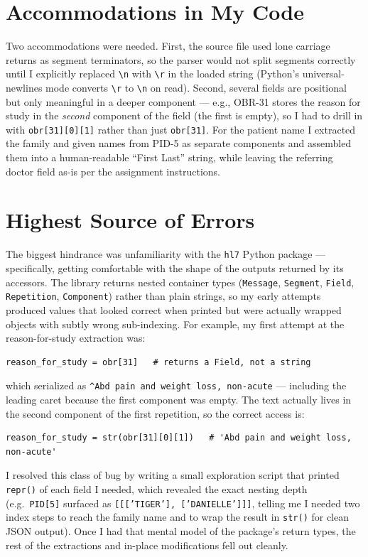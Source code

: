 \documentclass[10pt]{article}
\begin{document}
\section*{Accommodations in My Code}
Two accommodations were needed. First, the source file used lone carriage returns as segment terminators, so the parser would not split segments correctly until I explicitly replaced \verb|\n| with \verb|\r| in the loaded string (Python's universal-newlines mode converts \verb|\r| to \verb|\n| on read). Second, several fields are positional but only meaningful in a deeper component --- e.g., OBR-31 stores the reason for study in the \emph{second} component of the field (the first is empty), so I had to drill in with \texttt{obr[31][0][1]} rather than just \texttt{obr[31]}. For the patient name I extracted the family and given names from PID-5 as separate components and assembled them into a human-readable ``First Last'' string, while leaving the referring doctor field as-is per the assignment instructions.

\section*{Highest Source of Errors}
The biggest hindrance was unfamiliarity with the \texttt{hl7} Python package --- specifically, getting comfortable with the shape of the outputs returned by its accessors. The library returns nested container types (\texttt{Message}, \texttt{Segment}, \texttt{Field}, \texttt{Repetition}, \texttt{Component}) rather than plain strings, so my early attempts produced values that looked correct when printed but were actually wrapped objects with subtly wrong sub-indexing. For example, my first attempt at the reason-for-study extraction was:

\begin{lstlisting}
reason_for_study = obr[31]   # returns a Field, not a string
\end{lstlisting}

\noindent which serialized as \texttt{\^{}Abd pain and weight loss, non-acute} --- including the leading caret because the first component was empty. The text actually lives in the second component of the first repetition, so the correct access is:

\begin{lstlisting}
reason_for_study = str(obr[31][0][1])   # 'Abd pain and weight loss, non-acute'
\end{lstlisting}

\noindent I resolved this class of bug by writing a small exploration script that printed \texttt{repr()} of each field I needed, which revealed the exact nesting depth (e.g.\ \texttt{PID[5]} surfaced as \texttt{[[['TIGER'], ['DANIELLE']]]}, telling me I needed two index steps to reach the family name and to wrap the result in \texttt{str()} for clean JSON output). Once I had that mental model of the package's return types, the rest of the extractions and in-place modifications fell out cleanly.
\end{document}
